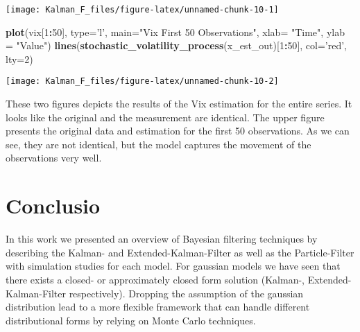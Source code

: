 \documentclass[
]{article}
\newenvironment{Shaded}{\begin{snugshade}}{\end{snugshade}}
\newcommand{\DataTypeTok}[1]{\textcolor[rgb]{0.13,0.29,0.53}{#1}}
\newcommand{\DecValTok}[1]{\textcolor[rgb]{0.00,0.00,0.81}{#1}}
\newcommand{\KeywordTok}[1]{\textcolor[rgb]{0.13,0.29,0.53}{\textbf{#1}}}
\newcommand{\NormalTok}[1]{#1}
\newcommand{\OperatorTok}[1]{\textcolor[rgb]{0.81,0.36,0.00}{\textbf{#1}}}
\newcommand{\StringTok}[1]{\textcolor[rgb]{0.31,0.60,0.02}{#1}}
\begin{document}
\begin{center}\texttt{[image: Kalman\_F\_files/figure-latex/unnamed-chunk-10-1]} \end{center}

\begin{Shaded}
\begin{Highlighting}[]
\KeywordTok{plot}\NormalTok{(vix[}\DecValTok{1}\OperatorTok{:}\DecValTok{50}\NormalTok{], }\DataTypeTok{type=}\StringTok{'l'}\NormalTok{, }\DataTypeTok{main=}\StringTok{"Vix First 50 Observations"}\NormalTok{, }\DataTypeTok{xlab=} \StringTok{"Time"}\NormalTok{, }\DataTypeTok{ylab =} \StringTok{"Value"}\NormalTok{)}
\KeywordTok{lines}\NormalTok{(}\KeywordTok{stochastic_volatility_process}\NormalTok{(x_est_out)[}\DecValTok{1}\OperatorTok{:}\DecValTok{50}\NormalTok{], }\DataTypeTok{col=}\StringTok{'red'}\NormalTok{, }\DataTypeTok{lty=}\DecValTok{2}\NormalTok{)}
\end{Highlighting}
\end{Shaded}

\begin{center}\texttt{[image: Kalman\_F\_files/figure-latex/unnamed-chunk-10-2]} \end{center}

These two figures depicts the results of the Vix estimation for the
entire series. It looks like the original and the measurement are
identical. The upper figure presents the original data and estimation
for the first 50 observations. As we can see, they are not identical,
but the model captures the movement of the observations very well.

\hypertarget{conclusio}{%
\section{Conclusio}\label{conclusio}}

In this work we presented an overview of Bayesian filtering techniques
by describing the Kalman- and Extended-Kalman-Filter as well as the
Particle-Filter with simulation studies for each model. For gaussian
models we have seen that there exists a closed- or approximately closed
form solution (Kalman-, Extended-Kalman-Filter respectively). Dropping
the assumption of the gaussian distribution lead to a more flexible
framework that can handle different distributional forms by relying on
Monte Carlo techniques.
\end{document}
